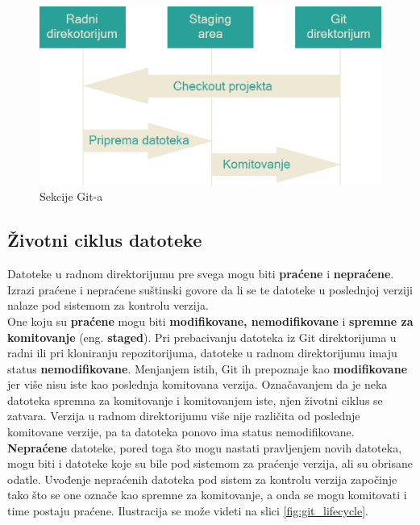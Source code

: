 \documentclass[a4paper]{article}
\begin{document}
{\begin{figure}[h!]
\begin{center}
\includegraphics[scale=0.19]{images/sekcije.png}
\end{center}
\caption{Sekcije Git-a}
\label{fig:git_sekcije}
\end{figure}



\subsection{Životni ciklus datoteke}
\label{subsec:ciklus}
Datoteke u radnom direktorijumu pre svega mogu biti \textbf{praćene} i \textbf{nepraćene}. Izrazi praćene i nepraćene suštinski govore da li se te datoteke u poslednjoj verziji nalaze pod sistemom za kontrolu verzija.\\
One koju su \textbf{praćene} mogu biti \textbf{modifikovane, nemodifikovane} i \textbf{spremne za komitovanje }(eng. \textbf{staged}). Pri prebacivanju datoteka iz Git direktorijuma u radni ili pri kloniranju repozitorijuma, datoteke u radnom direktorijumu imaju status \textbf{nemodifikovane}. Menjanjem istih, Git ih prepoznaje kao \textbf{modifikovane} jer više nisu iste kao poslednja komitovana verzija. Označavanjem da je neka datoteka spremna za komitovanje i komitovanjem iste, njen životni ciklus se zatvara. Verzija u radnom direktorijumu više nije različita od poslednje komitovane verzije, pa ta datoteka ponovo ima status nemodifikovane.
\textbf{Nepraćene} datoteke, pored toga što mogu nastati pravljenjem novih datoteka, mogu biti i datoteke koje su bile pod sistemom za praćenje verzija, ali su obrisane odatle. Uvođenje nepraćenih datoteka pod sistem za kontrolu verzija započinje tako što se one označe kao spremne za komitovanje, a onda se mogu komitovati i time postaju praćene.
Ilustracija se može videti na slici \ref{fig:git_lifecycle}.

}
\end{document}
